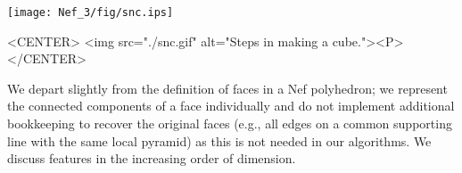 \begin{ccTexOnly}
    \begin{center}
      \parbox{0.6\textwidth}{%
          \texttt{[image: Nef\_3/fig/snc.ips]}%
      }
    \end{center}
\end{ccTexOnly}

\begin{ccHtmlOnly}
    <CENTER>
        <img src="./snc.gif" alt="Steps in making a cube."><P>
    </CENTER>
\end{ccHtmlOnly}

We depart slightly from the
definition of faces in a Nef polyhedron; we represent the connected
components of a face individually and do not implement additional
bookkeeping to recover the original faces (e.g., all edges on a common
supporting line with the same local pyramid) as this is not needed in
our algorithms.  We discuss features in the increasing order of 
dimension.

